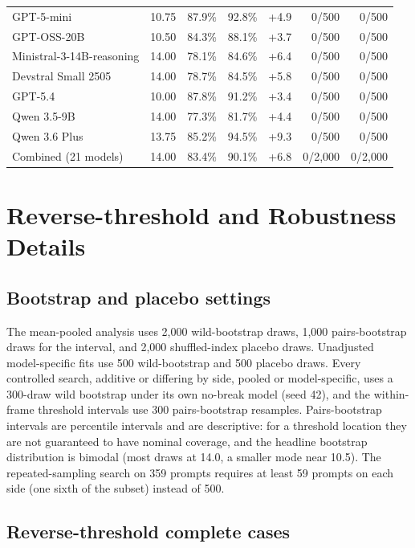 \documentclass{article}
\begin{document}
\begin{table}[h]
\begin{tabular}{@{}lrrrrrr@{}}
GPT-5-mini               & 10.75 & 87.9\% & 92.8\% & +4.9 & 0/500 & 0/500 \\
GPT-OSS-20B              & 10.50 & 84.3\% & 88.1\% & +3.7 & 0/500 & 0/500 \\
Ministral-3-14B-reasoning & 14.00 & 78.1\% & 84.6\% & +6.4 & 0/500 & 0/500 \\
Devstral Small 2505      & 14.00 & 78.7\% & 84.5\% & +5.8 & 0/500 & 0/500 \\
GPT-5.4                  & 10.00 & 87.8\% & 91.2\% & +3.4 & 0/500 & 0/500 \\
Qwen 3.5-9B              & 14.00 & 77.3\% & 81.7\% & +4.4 & 0/500 & 0/500 \\
Qwen 3.6 Plus            & 13.75 & 85.2\% & 94.5\% & +9.3 & 0/500 & 0/500 \\
\midrule
Combined (21 models)     & 14.00 & 83.4\% & 90.1\% & +6.8 & 0/2{,}000 & 0/2{,}000 \\
\bottomrule
\end{tabular}
\end{table}

\clearpage
\section{Reverse-threshold and Robustness Details}
\label{app:robustness}

\subsection{Bootstrap and placebo settings}

The mean-pooled analysis uses 2{,}000 wild-bootstrap draws, 1{,}000 pairs-bootstrap draws for the interval, and 2{,}000 shuffled-index placebo draws. Unadjusted model-specific fits use 500 wild-bootstrap and 500 placebo draws. Every controlled search, additive or differing by side, pooled or model-specific, uses a 300-draw wild bootstrap under its own no-break model (seed 42), and the within-frame threshold intervals use 300 pairs-bootstrap resamples. Pairs-bootstrap intervals are percentile intervals and are descriptive: for a threshold location they are not guaranteed to have nominal coverage, and the headline bootstrap distribution is bimodal (most draws at 14.0, a smaller mode near 10.5). The repeated-sampling search on 359 prompts requires at least 59 prompts on each side (one sixth of the subset) instead of 500.

\subsection{Reverse-threshold complete cases}
\end{document}
